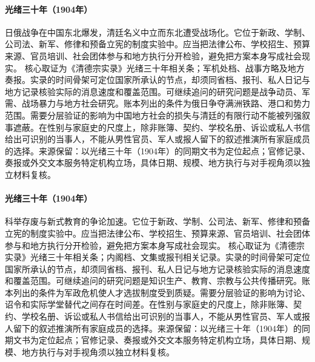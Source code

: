 \hypertarget{public:EQ-1904-RUSSO-JAPANESE-WAR}{}\paragraph{光绪三十年（1904年）}日俄战争在中国东北爆发，清廷名义中立而东北遭受战场化。它位于新政、学制、公司法、新军、修律和预备立宪的制度实验中。应当把法律公布、学校招生、预算来源、官员培训、社会团体参与和地方执行分开检验，避免把方案本身写成社会现实。 核心取证为《清德宗实录》光绪三十年相关条；军机处档、战事方略及地方奏报。实录的时间骨架可定位国家所承认的节点，却须同省档、报刊、私人日记与地方记录核验实际的消息速度和覆盖范围。可继续追问的研究问题是战争动员、军需、战场暴力与地方社会研究。账本列出的条件为俄日争夺满洲铁路、港口和势力范围。需要分层验证的影响为中国地方社会的损失与清廷的有限行动不能被列强叙事遮蔽。在性别与家庭史的尺度上，除非账簿、契约、学校名册、诉讼或私人书信给出可识别的当事人，不能从男性官员、军人或报人留下的叙述推演所有家庭成员的选择。来源保留：以光绪三十年（1904年）的同期文书为定位起点；官修记录、奏报或外交文本服务特定机构立场，具体日期、规模、地方执行与对手视角须以独立材料复核。
\hypertarget{public:EQ-1904-IMPERIAL-EXAMINATION-DEBATE}{}\paragraph{光绪三十年（1904年）}科举存废与新式教育的争论加速。它位于新政、学制、公司法、新军、修律和预备立宪的制度实验中。应当把法律公布、学校招生、预算来源、官员培训、社会团体参与和地方执行分开检验，避免把方案本身写成社会现实。 核心取证为《清德宗实录》光绪三十年相关条；内阁档、文集或报刊相关记录。实录的时间骨架可定位国家所承认的节点，却须同省档、报刊、私人日记与地方记录核验实际的消息速度和覆盖范围。可继续追问的研究问题是知识生产、教育、宗教与公共传播研究。账本列出的条件为军政危机使人才选拔制度受到质疑。需要分层验证的影响为讨论、诏令和实际学堂替代之间存在时间差。在性别与家庭史的尺度上，除非账簿、契约、学校名册、诉讼或私人书信给出可识别的当事人，不能从男性官员、军人或报人留下的叙述推演所有家庭成员的选择。来源保留：以光绪三十年（1904年）的同期文书为定位起点；官修记录、奏报或外交文本服务特定机构立场，具体日期、规模、地方执行与对手视角须以独立材料复核。

